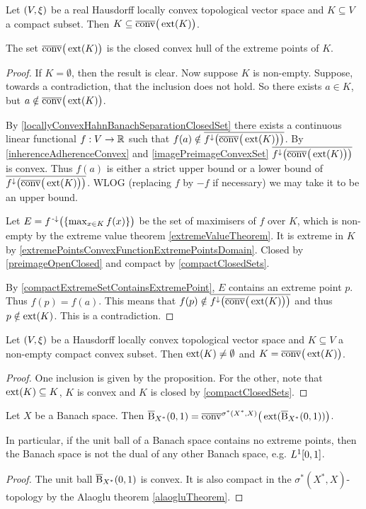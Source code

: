 \begin{proposition}
Let $\sSet{V,\xi}$ be a real Hausdorff locally convex topological vector space and $K\subseteq V$ a compact subset. Then $K\subseteq \overline{\operatorname{conv}}\big(\operatorname{ext}(K)\big)$.
\end{proposition}
The set $\overline{\operatorname{conv}}\big(\operatorname{ext}(K)\big)$ is the closed convex hull of the extreme points of $K$.
\begin{proof}
If $K = \emptyset$, then the result is clear. Now suppose $K$ is non-empty. Suppose, towards a contradiction, that the inclusion does not hold. So there exists $a\in K$, but $a\notin \overline{\operatorname{conv}}\big(\operatorname{ext}(K)\big)$.

By \ref{locallyConvexHahnBanachSeparationClosedSet} there exists a continuous linear functional $f: V\to \mathbb{R}$ such that $f(a) \notin \overline{f^\downarrow\big(\overline{\operatorname{conv}}\big(\operatorname{ext}(K)\big)\big)}$. By \ref{inherenceAdherenceConvex} and \ref{imagePreimageConvexSet} $\overline{f^\downarrow\big(\overline{\operatorname{conv}}\big(\operatorname{ext}(K)\big)\big)}$ is convex. Thus $f(a)$ is either a strict upper bound or a lower bound of $\overline{f^\downarrow\big(\overline{\operatorname{conv}}\big(\operatorname{ext}(K)\big)\big)}$. WLOG (replacing $f$ by $-f$ if necessary) we may take it to be an upper bound.

Let $E = f^{{\text{\hspace{0.15em}-}\downarrow}}\big(\{\max_{x\in K} f(x)\}\big)$ be the set of maximisers of $f$ over $K$, which is non-empty by the extreme value theorem \ref{extremeValueTheorem}. It is extreme in $K$ by \ref{extremePointsConvexFunctionExtremePointsDomain}. Closed by \ref{preimageOpenClosed} and compact by \ref{compactClosedSets}.

By \ref{compactExtremeSetContainsExtremePoint}, $E$ contains an extreme point $p$. Thus $f(p) = f(a)$. This means that $f(p) \notin \overline{f^\downarrow\big(\overline{\operatorname{conv}}\big(\operatorname{ext}(K)\big)\big)}$ and thus $p \notin \operatorname{ext}(K)$. This is a contradiction.
\end{proof}
\begin{corollary}
Let $\sSet{V,\xi}$ be a Hausdorff locally convex topological vector space and $K\subseteq V$ a non-empty compact convex subset. Then $\operatorname{ext}(K)\neq \emptyset$ and $K = \overline{\operatorname{conv}}\big(\operatorname{ext}(K)\big)$.
\end{corollary}
\begin{proof}
One inclusion is given by the proposition. For the other, note that $\operatorname{ext}(K) \subseteq K$, $K$ is convex and $K$ is closed by \ref{compactClosedSets}.
\end{proof}

\begin{lemma}
Let $X$ be a Banach space. Then $\operatorname{\overline{B}}_{X^*}(0,1) = \overline{\operatorname{conv}}^{\sigma^*(X^*,X)}\big(\operatorname{ext}(\operatorname{\overline{B}}_{X^*}(0,1))\big)$.
\end{lemma}
In particular, if the unit ball of a Banach space contains no extreme points, then the Banach space is not the dual of any other Banach space, e.g. $L^1\interval{0,1}$.
\begin{proof}
The unit ball $\operatorname{\overline{B}}_{X^*}(0,1)$ is convex. It is also compact in the $\sigma^*(X^*,X)$-topology by the Alaoglu theorem \ref{alaogluTheorem}.
\end{proof}

